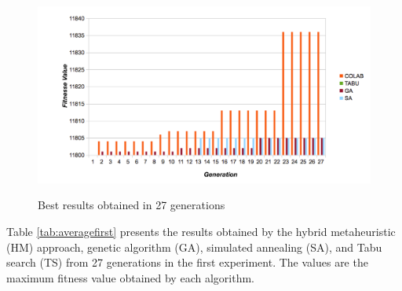 \documentclass{report}
\begin{document}
\begin{figure}[h]
\centering
\caption{Best results obtained in 27 generations}
\includegraphics[width=1\textwidth]{./images/generationcomparative.png}
\label{fig:exp1bestresults}
\end{figure}

Table \ref{tab:averagefirst} presents the results obtained by the hybrid metaheuristic (HM) approach, genetic algorithm (GA), simulated annealing (SA), and Tabu search (TS) from 27 generations in the first experiment. The values are the maximum fitness value obtained by each algorithm. 
\end{document}
